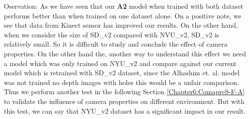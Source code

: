 Oservation: As we have seen that our \textbf{A2} model when trained with both dataset performs better than when trained on one dataset alone. On a positive note, we see that data from Kinect sensor has improved our results. On the other hand, when we consider the size of SD\_v2 compared with NVU\_v2, SD\_v2 is relatively small. So it is difficult to study and conclude the effect of camera properties. On the other hand the, another way to understand this effect we need a model which was only trained on NYU\_v2 and compare against our current model which is retrained with SD\_v2 dataset, since the Alhashim et. al. model was not trained no depth images with holes this would be a unfair comparison. Thus we perform another test in the following Section \ref{Chapter6:ComapreS-F-A} to validate the influence of camera properties on different environment. But with this test, we can say that NYU\_v2 dataset has a significant impact in our result.

